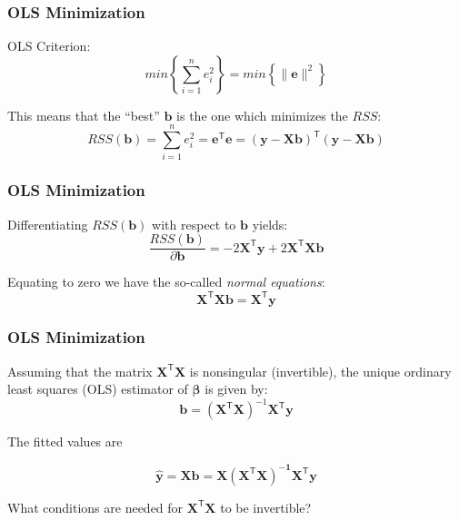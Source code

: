 \documentclass[12pt]{beamer}\usepackage[]{graphicx}\usepackage[]{color}
\begin{document}

\begin{frame}
\begin{center}
\Huge{}
\end{center}
\end{frame}


\begin{frame}
\frametitle{OLS Minimization}

OLS Criterion:
$$
min \left \{ \sum_{i=1}^{n} e_{i}^{2} \right \} = min \left \{ \| \mathbf{e} \|^2 \right \}
$$

This means that the ``best'' $\mathbf{b}$ is the one which minimizes the $RSS$:
$$
RSS(\mathbf{b}) = \sum_{i=1}^{n} e_i^2 = \mathbf{e^{\mathsf{T}} e} = \mathbf{(y - Xb)^{\mathsf{T}} (y - Xb)}
$$

\end{frame}


\begin{frame}
\frametitle{OLS Minimization}

Differentiating $RSS(\mathbf{b})$ with respect to $\mathbf{b}$ yields:
$$
\frac{RSS(\mathbf{b})}{\partial \mathbf{b}} = -2 \mathbf{X^{\mathsf{T}}y} + 2 \mathbf{X^{\mathsf{T}} Xb}
$$

\pause
Equating to zero we have the so-called \textit{normal equations}:
$$
\mathbf{X^{\mathsf{T}} Xb = X^{\mathsf{T}} y}
$$

\end{frame}


\begin{frame}
\frametitle{OLS Minimization}

Assuming that the matrix $\mathbf{X^{\mathsf{T}} X}$ is nonsingular (invertible),
the unique ordinary least squares (OLS) estimator of $\boldsymbol{\beta}$ 
is given by: 
$$
\mathbf{b} = (\mathbf{X}^{\mathsf{T}} \mathbf{X})^{-1} \mathbf{X}^{\mathsf{T}} \mathbf{y}
$$

\pause
The fitted values are

$$
\mathbf{\hat{y}} = \mathbf{X b} = 
\mathbf{X (X^{\mathsf{T}} X)^{-1} X^{\mathsf{T}} y}
$$

\bigskip
{\mdlit What conditions are needed for $\mathbf{X^{\mathsf{T}} X}$ to be invertible?}

\end{frame}
\end{document}
